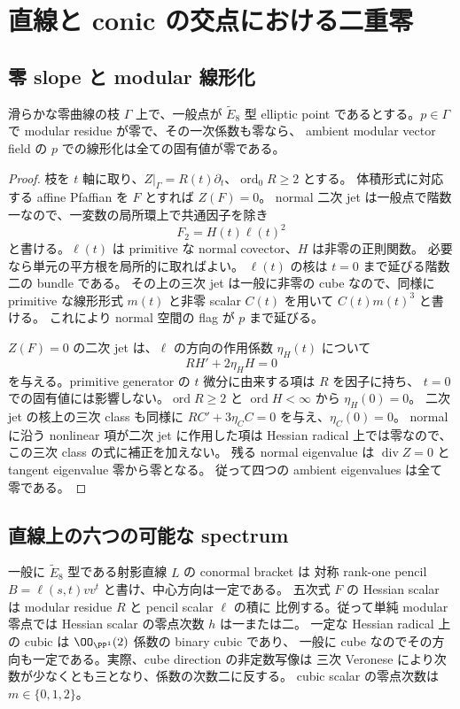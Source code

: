 \section{直線と conic の交点における二重零}

\subsection{零 slope と modular 線形化}

\begin{lemma}\label{lem:zero-slope-nilpotent}
滑らかな零曲線の枝 $\Gamma$ 上で、一般点が $\widetilde E_8$ 型 elliptic point
であるとする。$p\in\Gamma$ で modular residue が零で、その一次係数も零なら、
ambient modular vector field の $p$ での線形化は全ての固有値が零である。
\end{lemma}

\begin{proof}
枝を $t$ 軸に取り、$Z|_\Gamma=R(t)\partial_t$、$\operatorname{ord}_0R\ge2$ とする。
体積形式に対応する affine Pfaffian を $F$ とすれば $Z(F)=0$。
normal 二次 jet は一般点で階数一なので、一変数の局所環上で共通因子を除き
\[
 F_2=H(t)\ell(t)^2
\]
と書ける。$\ell(t)$ は primitive な normal covector、$H$ は非零の正則関数。
必要なら単元の平方根を局所的に取ればよい。
$\ell(t)$ の核は $t=0$ まで延びる階数二の bundle である。
その上の三次 jet は一般に非零の cube なので、同様に primitive な線形形式
$m(t)$ と非零 scalar $C(t)$ を用いて $C(t)m(t)^3$ と書ける。
これにより normal 空間の flag が $p$ まで延びる。

$Z(F)=0$ の二次 jet は、$\ell$ の方向の作用係数 $\eta_H(t)$ について
\[
 RH'+2\eta_H H=0
\]
を与える。primitive generator の $t$ 微分に由来する項は $R$ を因子に持ち、
$t=0$ での固有値には影響しない。$\operatorname{ord}R\ge2$ と
$\operatorname{ord}H<\infty$ から $\eta_H(0)=0$。
二次 jet の核上の三次 class も同様に
$RC'+3\eta_C C=0$ を与え、$\eta_C(0)=0$。
normal に沿う nonlinear 項が二次 jet に作用した項は Hessian radical 上では零なので、
この三次 class の式に補正を加えない。
残る normal eigenvalue は $\operatorname{div}Z=0$ と tangent eigenvalue 零から零となる。
従って四つの ambient eigenvalues は全て零である。
\end{proof}

\subsection{直線上の六つの可能な spectrum}

一般に $\widetilde E_8$ 型である射影直線 $L$ の conormal bracket は
対称 rank-one pencil $B=\ell(s,t)vv^t$ と書け、中心方向は一定である。
五次式 $F$ の Hessian scalar は modular residue $R$ と pencil scalar $\ell$ の積に
比例する。従って単純 modular 零点では Hessian scalar の零点次数 $h$ は一または二。
一定な Hessian radical 上の cubic は $\OO_{\PP^1}(2)$ 係数の binary cubic であり、
一般に cube なのでその方向も一定である。実際、cube direction の非定数写像は
三次 Veronese により次数が少なくとも三となり、係数の次数二に反する。
cubic scalar の零点次数は $m\in\{0,1,2\}$。

